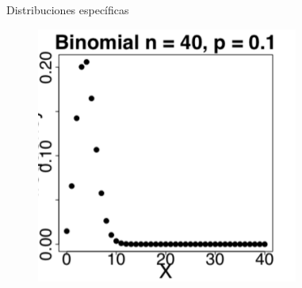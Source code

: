 \documentclass[10pt]{beamer}
\begin{document}
\begin{frame}{Distribuciones espec\'ificas}
\begin{figure}
\begin{minipage}{.3\textwidth}
		\includegraphics[width=0.8\linewidth]{v15}
	\end{minipage}
\end{figure}
\end{frame}
\end{document}
